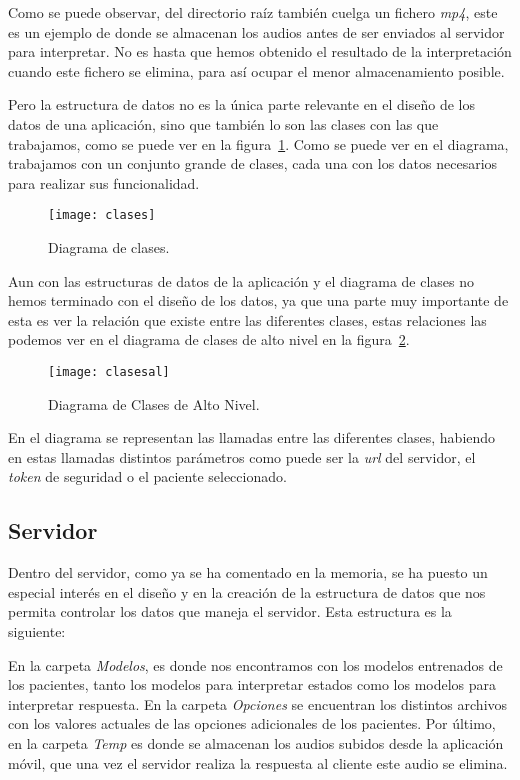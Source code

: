 Como se puede observar, del directorio raíz también cuelga un fichero \textit{mp4}, este es un ejemplo de donde se almacenan los audios antes de ser enviados al servidor para interpretar. No es hasta que hemos obtenido el resultado de la interpretación cuando este fichero se elimina, para así ocupar el menor almacenamiento posible.

Pero la estructura de datos no es la única parte relevante en el diseño de los datos de una aplicación, sino que también lo son las clases con las que trabajamos, como se puede ver en la figura~\ref{fig:clases}. Como se puede ver en el diagrama, trabajamos con un conjunto grande de clases, cada una con los datos necesarios para realizar sus funcionalidad.

\begin{figure}[H]
	\centering
	\texttt{[image: clases]}
	\caption{Diagrama de clases.}
	\label{fig:clases}
\end{figure}

Aun con las estructuras de datos de la aplicación y el diagrama de clases no hemos terminado con el diseño de los datos, ya que una parte muy importante de esta es ver la relación que existe entre las diferentes clases, estas relaciones las podemos ver en el diagrama de clases de alto nivel en la figura~\ref{fig:clasesal}.

\begin{figure}[H]
	\centering
	\texttt{[image: clasesal]}
	\caption{Diagrama de Clases de Alto Nivel.}
	\label{fig:clasesal}
\end{figure}

En el diagrama se representan las llamadas entre las diferentes clases, habiendo en estas llamadas distintos parámetros como puede ser la \textit{url} del servidor, el \textit{token} de seguridad o el paciente seleccionado.

\subsection{Servidor} \label{server}
Dentro del servidor, como ya se ha comentado en la memoria, se ha puesto un especial interés en el diseño y en la creación de la estructura de datos que nos permita controlar los datos que maneja el servidor. Esta estructura es la siguiente:

En la carpeta \textit{Modelos}, es donde nos encontramos con los modelos entrenados de los pacientes, tanto los modelos para interpretar estados como los modelos para interpretar respuesta. En la carpeta \textit{Opciones} se encuentran los distintos archivos con los valores actuales de las opciones adicionales de los pacientes. Por último, en la carpeta \textit{Temp} es donde se almacenan los audios subidos desde la aplicación móvil, que una vez el servidor realiza la respuesta al cliente este audio se elimina.
\newpage
